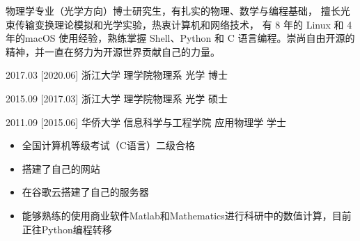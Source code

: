 \documentclass[zh]{resume}
\begin{document}
\makeheader

{\onehalfspacing\hspace{2em}
物理学专业（光学方向）博士研究生，有扎实的物理、数学与编程基础，
擅长光束传输变换理论模拟和光学实验，热衷计算机和网络技术，
有 8 年的 Linux 和 4年的macOS 使用经验，熟练掌握 Shell、Python 和 C 语言编程。崇尚自由开源的精神，并一直在努力为开源世界贡献自己的力量。
\par}

\begin{competences}
\end{competences}

\begin{educations}
  \education%
    {2017.03}%
    [2020.06]%
    {浙江大学}%
    {理学院物理系}%
    {光学}%
    {博士}

\separator{0.5ex}
\education%
{2015.09}%
[2017.03]%
{浙江大学}%
{理学院物理系}%
{光学}%
{硕士}

  \separator{0.5ex}
  \education%
    {2011.09}%
    [2015.06]%
    {华侨大学}%
    {信息科学与工程学院}%
    {应用物理学}%
    {学士}
\end{educations}

\begin{itemize}
  \item 全国计算机等级考试（C语言）二级合格
  \item 搭建了自己的网站
  \item 在谷歌云搭建了自己的服务器
  \item 能够熟练的使用商业软件Matlab和Mathematics进行科研中的数值计算，目前正往Python编程转移
\end{itemize}
\end{document}
